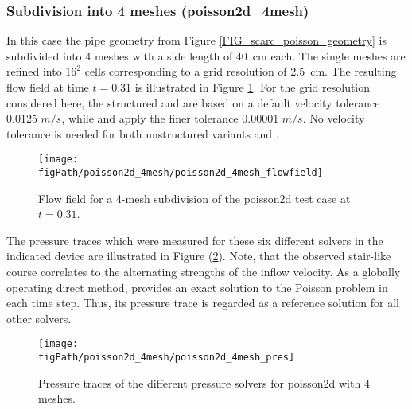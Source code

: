 \subsubsection{Subdivision into 4 meshes ({\ct poisson2d\_4mesh})}
\label{SEC_SCARC_poisson_four}

In this case the pipe geometry from Figure \ref{FIG_scarc_poisson_geometry} is subdivided into 4 meshes with a side length of 40~cm  each. The single meshes are refined into $16^2$ cells corresponding to a grid resolution of 2.5~cm. The resulting flow field at time $t=0.31$ is illustrated in Figure \ref{FIG_scarc_poisson_four_flowfield}.
%
For the grid resolution considered here, the structured \fftdefault{} and \scarcdefault{} are based on a 
default velocity tolerance 0.0125 $m/s$, while \ffttight{} and \scarctight{} apply the finer tolerance 0.00001 $m/s$.
No velocity tolerance is needed for both unstructured variants \uglmat{} and \uscarc{}. 


\begin{figure}[ht]
\begin{center}
\texttt{[image: \\figPath/poisson2d\_4mesh/poisson2d\_4mesh\_flowfield]}
\end{center}
\caption[Flow field for a 4-mesh subdivision of the poisson2d test case]{Flow field for a 4-mesh subdivision of the poisson2d test case at $t=0.31$.}
\label{FIG_scarc_poisson_four_flowfield}
\end{figure}


The pressure traces which were measured for these six different solvers in the indicated device
are illustrated in Figure (\ref{FIG_SCARC_poisson_four_trace}).
Note, that the observed stair-like course correlates to the alternating strengths of the inflow velocity.
As a globally operating direct method, \uglmat{} provides an exact solution to the Poisson problem in each time step. Thus, its pressure trace is regarded as a reference solution for all other solvers.

\begin{figure}[ht]
\begin{center}
\texttt{[image: \\figPath/poisson2d\_4mesh/poisson2d\_4mesh\_pres]}
\end{center}
\caption[Pressure traces of the different pressure solvers for {\ct poisson2d} with 4 meshes]{Pressure traces of the different pressure solvers for {\ct poisson2d} with 4 meshes. }
\label{FIG_SCARC_poisson_four_trace}
\end{figure}

